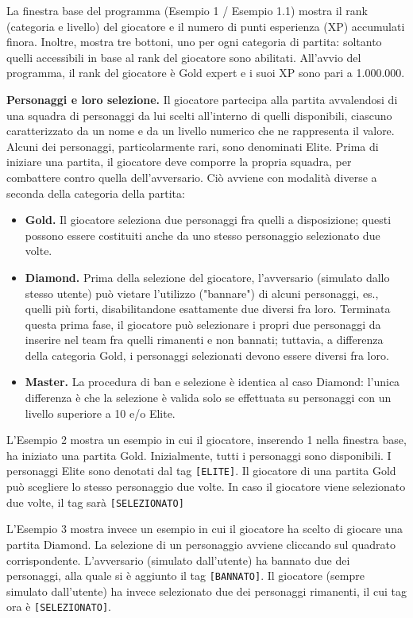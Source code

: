 \documentclass{article}
\begin{document}
La finestra base del programma (Esempio 1 / Esempio 1.1) mostra il rank (categoria e livello) del giocatore e il numero di punti esperienza (XP) accumulati finora. Inoltre, mostra tre bottoni, uno per ogni categoria di partita: soltanto quelli accessibili in base al rank del giocatore sono abilitati. All'avvio del programma, il rank del giocatore è Gold expert e i suoi XP sono pari a 1.000.000.

\textbf{Personaggi e loro selezione.} Il giocatore partecipa alla partita avvalendosi di una squadra di personaggi da lui scelti all'interno di quelli disponibili, ciascuno caratterizzato da un nome e da un livello numerico che ne rappresenta il valore. Alcuni dei personaggi, particolarmente rari, sono denominati Elite. Prima di iniziare una partita, il giocatore deve comporre la propria squadra, per combattere contro quella dell'avversario. Ciò avviene con modalità diverse a seconda della categoria della partita:
\begin{itemize}
    \item \textbf{Gold.} Il giocatore seleziona due personaggi fra quelli a disposizione; questi possono essere costituiti anche da uno stesso personaggio selezionato due volte.
    \item \textbf{Diamond.} Prima della selezione del giocatore, l'avversario (simulato dallo stesso utente) può vietare l'utilizzo ("bannare") di alcuni personaggi, es., quelli più forti, disabilitandone esattamente due diversi fra loro. Terminata questa prima fase, il giocatore può selezionare i propri due personaggi da inserire nel team fra quelli rimanenti e non bannati; tuttavia, a differenza della categoria Gold, i personaggi selezionati devono essere diversi fra loro.
    \item \textbf{Master.} La procedura di ban e selezione è identica al caso Diamond: l'unica differenza è che la selezione è valida solo se effettuata su personaggi con un livello superiore a 10 e/o Elite.
\end{itemize}

L'Esempio 2 mostra un esempio in cui il giocatore, inserendo 1 nella finestra base, ha iniziato una partita Gold. Inizialmente, tutti i personaggi sono disponibili. I personaggi Elite sono denotati dal tag \texttt{[ELITE]}. Il giocatore di una partita Gold può scegliere lo stesso personaggio due volte. In caso il giocatore viene selezionato due volte, il tag sarà \texttt{[SELEZIONATO]}

L'Esempio 3 mostra invece un esempio in cui il giocatore ha scelto di giocare una partita Diamond. La selezione di un personaggio avviene cliccando sul quadrato corrispondente. L'avversario (simulato dall'utente) ha bannato due dei personaggi, alla quale si è aggiunto il tag \texttt{[BANNATO]}. Il giocatore (sempre simulato dall'utente) ha invece selezionato due dei personaggi rimanenti, il cui tag ora è \texttt{[SELEZIONATO]}.
\end{document}

